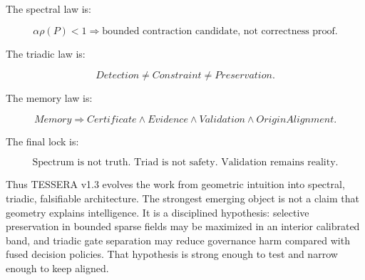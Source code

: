 \documentclass[12pt]{article}
\begin{document}
The spectral law is:

\[
\boxed{
\alpha\rho(P)<1
\Rightarrow
\text{bounded contraction candidate, not correctness proof.}
}
\]

The triadic law is:

\[
\boxed{
Detection\neq Constraint\neq Preservation.
}
\]

The memory law is:

\[
\boxed{
Memory
\Rightarrow
Certificate\wedge Evidence\wedge Validation\wedge OriginAlignment.
}
\]

The final lock is:

\[
\boxed{
\text{Spectrum is not truth. Triad is not safety. Validation remains reality.}
}
\]

Thus TESSERA v1.3 evolves the work from geometric intuition into spectral,
triadic, falsifiable architecture. The strongest emerging object is not a claim
that geometry explains intelligence. It is a disciplined hypothesis: selective
preservation in bounded sparse fields may be maximized in an interior calibrated
band, and triadic gate separation may reduce governance harm compared with
fused decision policies. That hypothesis is strong enough to test and narrow
enough to keep aligned.
\end{document}
